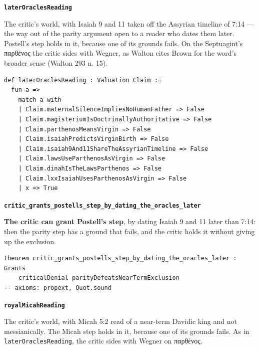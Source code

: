 \documentclass[11pt]{article}
\begin{document}
\par\medskip\noindent\textbf{\texttt{later\allowbreak{}Oracles\allowbreak{}Reading}}\par\nobreak\noindent
The critic’s world, with Isaiah 9 and 11 taken off the Assyrian timeline of 7:14 — the way out of the parity argument open to a reader who dates them later. Postell’s step holds in it, because one of its grounds fails. On the Septuagint’s παρθένος the critic sides with Wegner, as Walton cites Brown for the word’s broader sense (Walton 293 n. 15).

{\small\begin{verbatim}
def laterOraclesReading : Valuation Claim :=
  fun a =>
    match a with
    | Claim.maternalSilenceImpliesNoHumanFather => False
    | Claim.magisteriumIsDoctrinallyAuthoritative => False
    | Claim.parthenosMeansVirgin => False
    | Claim.isaiahPredictsVirginBirth => False
    | Claim.isaiah9And11ShareTheAssyrianTimeline => False
    | Claim.lawsUseParthenosAsVirgin => False
    | Claim.dinahIsTheLawsParthenos => False
    | Claim.lxxIsaiahUsesParthenosAsVirgin => False
    | x => True
\end{verbatim}}
\par\medskip\noindent\textbf{\texttt{critic\_\allowbreak{}grants\_\allowbreak{}postells\_\allowbreak{}step\_\allowbreak{}by\_\allowbreak{}dating\_\allowbreak{}the\_\allowbreak{}oracles\_\allowbreak{}later}}\par\nobreak\noindent
\textbf{The critic can grant Postell’s step}, by dating Isaiah 9 and 11 later than 7:14: then the parity step has a ground that fails, and the critic holds it without giving up the exclusion.

{\small\begin{verbatim}
theorem critic_grants_postells_step_by_dating_the_oracles_later : Grants
    criticalDenial parityDefeatsNearTermExclusion
-- axioms: propext, Quot.sound
\end{verbatim}}
\par\medskip\noindent\textbf{\texttt{royal\allowbreak{}Micah\allowbreak{}Reading}}\par\nobreak\noindent
The critic’s world, with Micah 5:2 read of a near-term Davidic king and not messianically. The Micah step holds in it, because one of its grounds fails. As in \texttt{later\allowbreak{}Oracles\allowbreak{}Reading}, the critic sides with Wegner on παρθένος.
\end{document}
